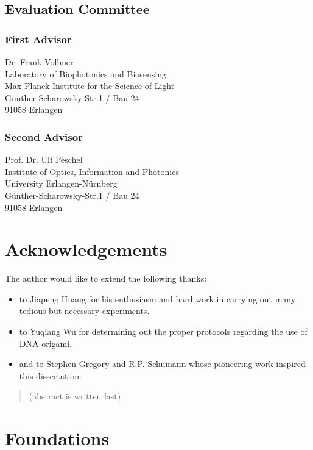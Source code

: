 \documentclass[a4paper,titlepage,onecolumn]{report}
\begin{document}
\section*{Evaluation Committee}
\subsection*{First Advisor}
Dr. Frank Vollmer\\
Laboratory of Biophotonics and Biosensing\\
Max Planck Institute for the Science of Light\\
G\"unther-Scharowsky-Str.1 / Bau 24\\
91058 Erlangen
\subsection*{Second Advisor}
Prof. Dr. Ulf Peschel\\
Institute of Optics, Information and Photonics\\
University Erlangen-N\"urnberg\\
G\"unther-Scharowsky-Str.1 / Bau 24\\
91058 Erlangen

\newpage
\chapter*{Acknowledgements}
The author would like to extend the following thanks:

\begin{itemize}
\renewcommand\labelitemi{--}
\item to Jiapeng Huang for his enthusiasm and hard work in carrying out
many tedious but necessary experiments.
\item to Yuqiang Wu for determining out the proper protocols regarding the use
of DNA origami.
\item and to Stephen Gregory and R.P. Schumann whose pioneering work
inspired this dissertation.
\end{itemize}

\tableofcontents

\begin{abstract}
(abstract is written last)
\end{abstract}

\chapter{Foundations}
\end{document}

